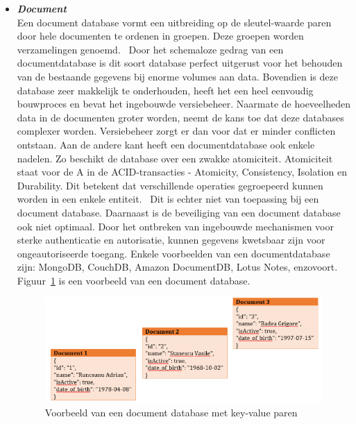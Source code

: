 \begin{itemize}
      \item \textbf{\textit{Document}} \\
            Een document database vormt een uitbreiding op de sleutel-waarde paren door hele documenten te ordenen in groepen. Deze groepen worden verzamelingen genoemd.~\autocite{Microsoft} Door het schemaloze gedrag van een documentdatabase is dit soort database perfect uitgerust voor het behouden van de bestaande gegevens bij enorme volumes aan data. Bovendien is deze database zeer makkelijk te onderhouden, heeft het een heel eenvoudig bouwproces en bevat het ingebouwde versiebeheer. Naarmate de hoeveelheden data in de documenten groter worden, neemt de kans toe dat deze databases complexer worden. Versiebeheer zorgt er dan voor dat er minder conflicten ontstaan. Aan de andere kant heeft een documentdatabase ook enkele nadelen. Zo beschikt de database over een zwakke atomiciteit. Atomiciteit staat voor de A in de ACID-transacties \mbox{-} Atomicity, Consistency, Isolation en Durability. Dit betekent dat verschillende operaties gegroepeerd kunnen worden in een enkele entiteit.~\autocite{Oracle} Dit is echter niet van toepassing bij een document database. Daarnaast is de beveiliging van een document database ook niet optimaal. Door het ontbreken van ingebouwde mechanismen voor sterke authenticatie en autorisatie, kunnen gegevens kwetsbaar zijn voor ongeautoriseerde toegang. Enkele voorbeelden van een documentdatabase zijn: MongoDB, CouchDB, Amazon DocumentDB, Lotus Notes, enzovoort.~\autocite{DistributedDatabase2022} Figuur~\ref{fig:document} is een voorbeeld van een document database.
            
            \begin{figure}[H]
                \centering
                \includegraphics[width=0.7\linewidth]{graphics/document}
                \caption[Voorbeeld van een document database met key-value paren]{Voorbeeld van een document database met key-value paren ~\autocite{DistributedDatabase2022}}
                \label{fig:document}
            \end{figure}
            

\end{itemize}
